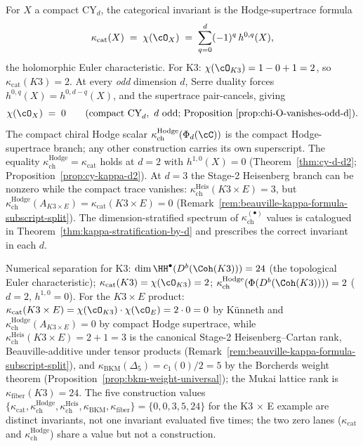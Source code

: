 \begin{remark}
\label{rem:kappa-cat-from-chi}
For $X$ a compact CY$_d$, the categorical invariant is the Hodge-supertrace formula
\[
 \kappa_{\mathrm{cat}}(X) \;=\; \chi(\cO_X) \;=\; \sum_{q=0}^{d} (-1)^q\, h^{0,q}(X),
\]
the holomorphic Euler characteristic. For K3: $\chi(\cO_{K3}) = 1 - 0 + 1 = 2$, so $\kappa_{\mathrm{cat}}(K3) = 2$. At every \emph{odd} dimension $d$, Serre duality forces $h^{0,q}(X) = h^{0,d-q}(X)$, and the supertrace pair-cancels, giving
\[
 \chi(\cO_X) \;=\; 0 \qquad (\text{compact CY}_d,\ d\ \text{odd; Proposition~\ref{prop:chi-O-vanishes-odd-d})}.
\]
The compact chiral Hodge scalar $\kappa_{\mathrm{ch}}^{\mathrm{Hodge}}(\Phi_d(\cC))$ is the compact Hodge-supertrace branch; any other construction carries its own superscript. The equality $\kappa_{\mathrm{ch}}^{\mathrm{Hodge}} = \kappa_{\mathrm{cat}}$ holds at $d = 2$ with $h^{1,0}(X) = 0$ (Theorem~\textup{\ref{thm:cy-d-d2}}; Proposition~\textup{\ref{prop:cy-kappa-d2}}). At $d = 3$ the Stage-2 Heisenberg branch can be nonzero while the compact trace vanishes: $\kappa_{\mathrm{ch}}^{\mathrm{Heis}}(K3 \times E) = 3$, but $\kappa_{\mathrm{ch}}^{\mathrm{Hodge}}(A_{K3\times E})=\kappa_{\mathrm{cat}}(K3\times E)=0$ (Remark~\ref{rem:beauville-kappa-formula-subscript-split}). The dimension-stratified spectrum of $\kappa_{\mathrm{ch}}^{(\bullet)}$ values is catalogued in Theorem~\textup{\ref{thm:kappa-stratification-by-d}} and prescribes the correct invariant in each $d$.

Numerical separation for K3: $\dim \HH^\bullet(D^b(\Coh(K3))) = 24$ (the topological Euler characteristic); $\kappa_{\mathrm{cat}}(K3) = \chi(\cO_{K3}) = 2$; $\kappa_{\mathrm{ch}}^{\mathrm{Hodge}}(\Phi(D^b(\Coh(K3)))) = 2$ ($d = 2$, $h^{1,0}=0$). For the $K3 \times E$ product: $\kappa_{\mathrm{cat}}(K3 \times E) = \chi(\cO_{K3}) \cdot \chi(\cO_E) = 2 \cdot 0 = 0$ by K\"unneth and $\kappa_{\mathrm{ch}}^{\mathrm{Hodge}}(A_{K3\times E})=0$ by compact Hodge supertrace, while $\kappa_{\mathrm{ch}}^{\mathrm{Heis}}(K3 \times E) = 2 + 1 = 3$ is the canonical Stage-2 Heisenberg--Cartan rank, Beauville-additive under tensor products (Remark~\ref{rem:beauville-kappa-formula-subscript-split}), and $\kappa_{\mathrm{BKM}}(\Delta_5) = c_1(0)/2 = 5$ by the Borcherds weight theorem (Proposition~\textup{\ref{prop:bkm-weight-universal}}); the Mukai lattice rank is $\kappa_{\mathrm{fiber}}(K3) = 24$. The five construction values $\{\kappa_{\mathrm{cat}}, \kappa_{\mathrm{ch}}^{\mathrm{Hodge}}, \kappa_{\mathrm{ch}}^{\mathrm{Heis}}, \kappa_{\mathrm{BKM}}, \kappa_{\mathrm{fiber}}\} = \{0, 0, 3, 5, 24\}$ for the K3 $\times$ E example are distinct invariants, not one invariant evaluated five times; the two zero lanes ($\kappa_{\mathrm{cat}}$ and $\kappa_{\mathrm{ch}}^{\mathrm{Hodge}}$) share a value but not a construction.
\end{remark}

